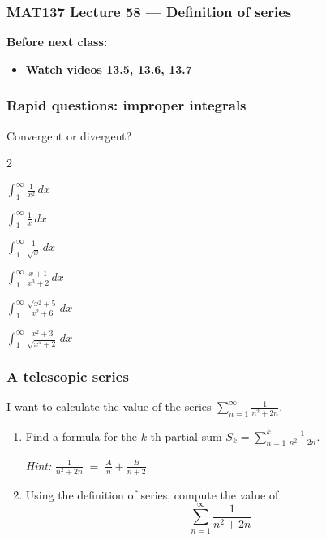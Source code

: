 \documentclass[14pt]{beamer}
\date{}
\title{}
\author{}
\newcommand{\p}{\pause}
\newcommand{\setsize}[1]{\fontsize{#1}{#1}\selectfont} %
\newcommand{\smallerfont}{\setsize{13}} %
\newcommand{\vv}{\vspace{.5cm}}
\begin{document}
\begin{frame}
	\frametitle{MAT137 Lecture 58 ---  	Definition of series }

	\vfill
	{\bf Before next class:}
		\begin{itemize} \normalsize
			\item {\bf Watch videos  	13.5, 13.6, 13.7}
		\end{itemize}
\end{frame}

	\begin{frame}[t]
		\frametitle{Rapid questions: improper integrals}

		Convergent or divergent?

		\begin{enumerate}
		\end{enumerate}
	\end{frame}

	\begin{frame}[t]
		\smallerfont
		\frametitle{A telescopic series}
		I want to calculate the value of the series \; ${\displaystyle  \sum_{n=1}^{\infty} \frac{1}{n^{2}+2n}. }$
		\vv
		\begin{enumerate}
			\item Find a formula for the $k$-th partial sum ${\displaystyle  S_k = \sum_{n=1}^{k} \frac{1}{n^{2}+2n}. }$

				\emph{Hint:} \; ${\displaystyle \frac{1}{n^{2}+2n} \; = \; \frac{A}{n} + \frac{B}{n+2} }$
				\vv

			\item Using the definition of series, compute the value of
				\[
					\sum_{n=1}^{\infty}\frac{1}{n^{2}+2n}
				\]
		\end{enumerate}
	\end{frame}
\end{document}
